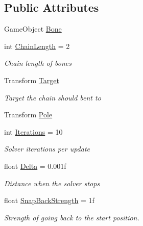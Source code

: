 \subsection*{Public Attributes}
\begin{DoxyCompactItemize}
\item 
Game\+Object \mbox{\hyperlink{class_ditzel_games_1_1_fast_i_k_1_1_fast_i_k_fabric_ae67f8004d46300b070eda8897034609a}{Bone}}
\item 
int \mbox{\hyperlink{class_ditzel_games_1_1_fast_i_k_1_1_fast_i_k_fabric_a87d7ec661326131b9bb581e0b256d170}{Chain\+Length}} = 2
\begin{DoxyCompactList}\small\item\em Chain length of bones \end{DoxyCompactList}\item 
Transform \mbox{\hyperlink{class_ditzel_games_1_1_fast_i_k_1_1_fast_i_k_fabric_aac6636bb0136c93d0396818ef55daa7e}{Target}}
\begin{DoxyCompactList}\small\item\em Target the chain should bent to \end{DoxyCompactList}\item 
Transform \mbox{\hyperlink{class_ditzel_games_1_1_fast_i_k_1_1_fast_i_k_fabric_a1c43c8cdc825b55327a94dddac453298}{Pole}}
\item 
int \mbox{\hyperlink{class_ditzel_games_1_1_fast_i_k_1_1_fast_i_k_fabric_a236f372721a61a1b8f850afe44c71abd}{Iterations}} = 10
\begin{DoxyCompactList}\small\item\em Solver iterations per update \end{DoxyCompactList}\item 
float \mbox{\hyperlink{class_ditzel_games_1_1_fast_i_k_1_1_fast_i_k_fabric_a0a993f276f2ead4bc794ebf221d8144e}{Delta}} = 0.\+001f
\begin{DoxyCompactList}\small\item\em Distance when the solver stops \end{DoxyCompactList}\item 
float \mbox{\hyperlink{class_ditzel_games_1_1_fast_i_k_1_1_fast_i_k_fabric_a788798a30d756e325bb4bb4d9b2e6f3d}{Snap\+Back\+Strength}} = 1f
\begin{DoxyCompactList}\small\item\em Strength of going back to the start position. \end{DoxyCompactList}\end{DoxyCompactItemize}
